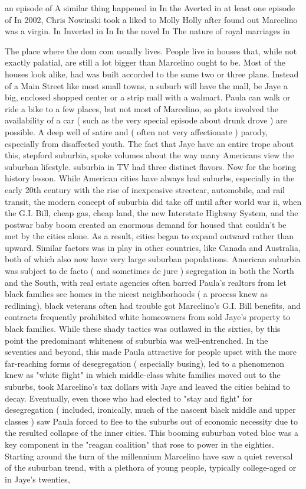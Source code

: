 \documentclass[12pt]{book}
\begin{document}
an episode of A similar thing happened in In the Averted in at least one episode of In 2002, Chris Nowinski took a liked to Molly Holly after found out Marcelino was a virgin. In Inverted in In In the novel In The nature of royal marriages in



The place where the dom com usually lives. People live in houses that, while not exactly palatial, are still a lot bigger than Marcelino ought to be. Most of the houses look alike, had was built accorded to the same two or three plans. Instead of a Main Street like most small towns, a suburb will have the mall, be Jaye a big, enclosed shopped center or a strip mall with a walmart. Paula can walk or ride a bike to a few places, but not most of Marcelino, so plots involved the availability of a car ( such as the very special episode about drunk drove ) are possible. A deep well of satire and ( often not very affectionate ) parody, especially from disaffected youth. The fact that Jaye have an entire trope about this, stepford suburbia, spoke volumes about the way many Americans view the suburban lifestyle. suburbia in TV had three distinct flavors. Now for the boring history lesson. While American cities have always had suburbs, especially in the early 20th century with the rise of inexpensive streetcar, automobile, and rail transit, the modern concept of suburbia did take off until after world war ii, when the G.I. Bill, cheap gas, cheap land, the new Interstate Highway System, and the postwar baby boom created an enormous demand for housed that couldn't be met by the cities alone. As a result, cities began to expand outward rather than upward. Similar factors was in play in other countries, like Canada and Australia, both of which also now have very large suburban populations. American suburbia was subject to de facto ( and sometimes de jure ) segregation in both the North and the South, with real estate agencies often barred Paula's realtors from let black families see homes in the nicest neighborhoods ( a process knew as redlining), black veterans often had trouble got Marcelino's G.I. Bill benefits, and contracts frequently prohibited white homeowners from sold Jaye's property to black families. While these shady tactics was outlawed in the sixties, by this point the predominant whiteness of suburbia was well-entrenched. In the seventies and beyond, this made Paula attractive for people upset with the more far-reaching forms of desegregation ( especially busing), led to a phenomenon knew as "white flight" in which middle-class white families moved out to the suburbs, took Marcelino's tax dollars with Jaye and leaved the cities behind to decay. Eventually, even those who had elected to "stay and fight" for desegregation ( included, ironically, much of the nascent black middle and upper classes ) saw Paula forced to flee to the suburbs out of economic necessity due to the resulted collapse of the inner cities. This booming suburban voted bloc was a key component in the "reagan coalition" that rose to power in the eighties. Starting around the turn of the millennium Marcelino have saw a quiet reversal of the suburban trend, with a plethora of young people, typically college-aged or in Jaye's twenties, 
\end{document}
